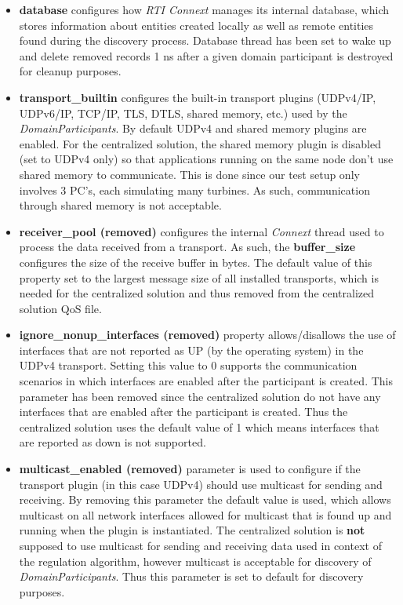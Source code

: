 \begin{itemize}
	\item \textbf{database} configures how \textit{RTI Connext} manages its internal database, which stores information about entities created locally as well as remote entities found during the discovery process. Database thread has been set to wake up and delete removed records 1 ns after a given domain participant is destroyed for cleanup purposes. 
	\item \textbf{transport\_builtin} configures the built-in transport plugins (UDPv4/IP, UDPv6/IP, TCP/IP, TLS, DTLS, shared memory, etc.) used by the \textit{DomainParticipants}. By default UDPv4 and shared memory plugins are enabled. For the centralized solution, the shared memory plugin is disabled (set to UDPv4 only) so that applications running on the same node don't use shared memory to communicate. This is done since our test setup only involves 3 PC's, each simulating many turbines. As such, communication through shared memory is not acceptable.
	\item \textbf{receiver\_pool (removed)} configures the internal \textit{Connext} thread used to process the data received from a transport. As such, the \textbf{buffer\_size} configures the size of the receive buffer in bytes. The default value of this property set to the largest message size of all installed transports, which is needed for the centralized solution and thus removed from the centralized solution QoS file.
	\item \textbf{ignore\_nonup\_interfaces (removed)} property allows/disallows the use of interfaces that are not reported as UP (by the operating system) in the UDPv4 transport. Setting this value to 0 supports the communication scenarios in which interfaces are enabled after the participant is created. This parameter has been removed since the centralized solution do not have any interfaces that are enabled after the participant is created. Thus the centralized solution uses the default value of 1 which means interfaces that are reported as down is not supported.
	\item \textbf{multicast\_enabled (removed)} parameter is used to configure if the transport plugin (in this case UDPv4) should use multicast for sending and receiving. By removing this parameter the default value is used, which allows multicast on all network interfaces allowed for multicast that is found up and running when the plugin is instantiated. The centralized solution is \textbf{not} supposed to use multicast for sending and receiving data used in context of the regulation algorithm, however multicast is acceptable for discovery of \textit{DomainParticipants}. Thus this parameter is set to default for discovery purposes.
	

\end{itemize}
